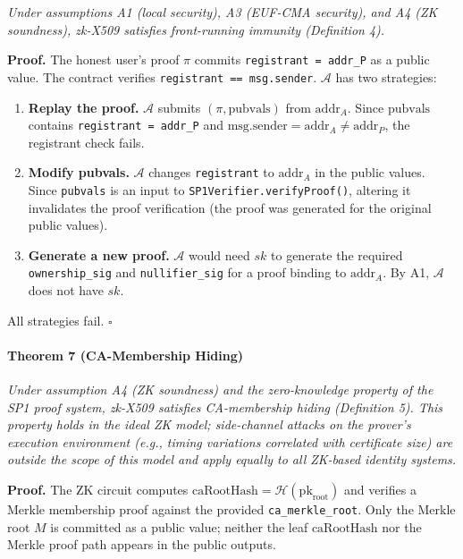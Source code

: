 \documentclass[11pt, a4paper]{article}
\begin{document}
\emph{Under assumptions A1 (local security), A3 (EUF-CMA security), and
A4 (ZK soundness), zk-X509 satisfies front-running immunity (Definition 4).}

\textbf{Proof.} The honest user's proof \(\pi\) commits
\texttt{registrant\ =\ addr\_P} as a public value. The contract verifies
\texttt{registrant\ ==\ msg.sender}. \(\mathcal{A}\) has two strategies:

\begin{enumerate}
\def\labelenumi{(\alph{enumi})}
\item
  \textbf{Replay the proof.} \(\mathcal{A}\) submits
  \((\pi, \text{pubvals})\) from \(\text{addr}_A\). Since
  \(\text{pubvals}\) contains \texttt{registrant\ =\ addr\_P} and
  \(\text{msg.sender} = \text{addr}_A \neq \text{addr}_P\), the
  registrant check fails.
\item
  \textbf{Modify pubvals.} \(\mathcal{A}\) changes \texttt{registrant}
  to \(\text{addr}_A\) in the public values. Since \texttt{pubvals} is
  an input to \texttt{SP1Verifier.verifyProof()}, altering it
  invalidates the proof verification (the proof was generated for the
  original public values).
\item
  \textbf{Generate a new proof.} \(\mathcal{A}\) would need \(sk\) to
  generate the required \texttt{ownership\_sig} and \texttt{nullifier\_sig}
  for a proof binding to \(\text{addr}_A\). By A1, \(\mathcal{A}\) does
  not have \(sk\).
\end{enumerate}

All strategies fail. \(\square\)

\paragraph{Theorem 7 (CA-Membership
Hiding)}\label{theorem-5-ca-membership-hiding}

\emph{Under assumption A4 (ZK soundness) and the zero-knowledge property
of the SP1 proof system, zk-X509 satisfies CA-membership hiding
(Definition 5). This property holds in the ideal ZK model; side-channel
attacks on the prover's execution environment (e.g., timing variations
correlated with certificate size) are outside the scope of this model
and apply equally to all ZK-based identity systems.}

\textbf{Proof.} The ZK circuit computes
\(\text{caRootHash} = \mathcal{H}(\text{pk}_{\text{root}})\) and
verifies a Merkle membership proof against the provided
\texttt{ca\_merkle\_root}. Only the Merkle root \(M\) is committed as a
public value; neither the leaf \(\text{caRootHash}\) nor the Merkle
proof path appears in the public outputs.
\end{document}
